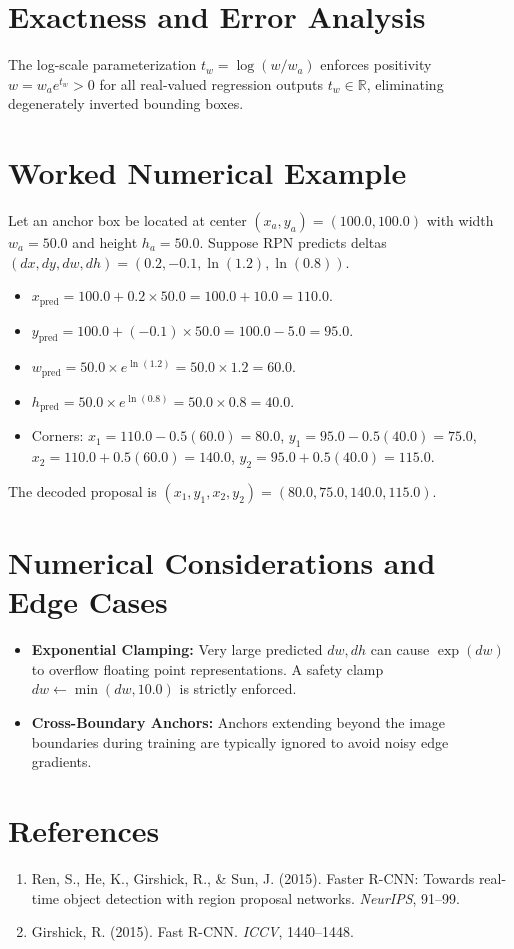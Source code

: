 \documentclass[11pt,a4paper]{article}
\theoremstyle{definition}
\begin{document}
\section{Exactness and Error Analysis}

The log-scale parameterization $t_w = \log(w / w_a)$ enforces positivity $w = w_a e^{t_w} > 0$ for all real-valued regression outputs $t_w \in \mathbb{R}$, eliminating degenerately inverted bounding boxes.

\section{Worked Numerical Example}

Let an anchor box be located at center $(x_a, y_a) = (100.0, 100.0)$ with width $w_a = 50.0$ and height $h_a = 50.0$.
Suppose RPN predicts deltas $(dx, dy, dw, dh) = (0.2, -0.1, \ln(1.2), \ln(0.8))$.
\begin{itemize}
    \item $x_{\text{pred}} = 100.0 + 0.2 \times 50.0 = 100.0 + 10.0 = 110.0$.
    \item $y_{\text{pred}} = 100.0 + (-0.1) \times 50.0 = 100.0 - 5.0 = 95.0$.
    \item $w_{\text{pred}} = 50.0 \times e^{\ln(1.2)} = 50.0 \times 1.2 = 60.0$.
    \item $h_{\text{pred}} = 50.0 \times e^{\ln(0.8)} = 50.0 \times 0.8 = 40.0$.
    \item Corners:
    $x_1 = 110.0 - 0.5(60.0) = 80.0$, $y_1 = 95.0 - 0.5(40.0) = 75.0$,
    $x_2 = 110.0 + 0.5(60.0) = 140.0$, $y_2 = 95.0 + 0.5(40.0) = 115.0$.
\end{itemize}
The decoded proposal is $(x_1, y_1, x_2, y_2) = (80.0, 75.0, 140.0, 115.0)$.

\section{Numerical Considerations and Edge Cases}

\begin{itemize}
    \item \textbf{Exponential Clamping:} Very large predicted $dw, dh$ can cause $\exp(dw)$ to overflow floating point representations. A safety clamp $dw \gets \min(dw, 10.0)$ is strictly enforced.
    \item \textbf{Cross-Boundary Anchors:} Anchors extending beyond the image boundaries during training are typically ignored to avoid noisy edge gradients.
\end{itemize}

\section{References}
\begin{enumerate}
    \item Ren, S., He, K., Girshick, R., & Sun, J. (2015). Faster R-CNN: Towards real-time object detection with region proposal networks. \emph{NeurIPS}, 91--99.
    \item Girshick, R. (2015). Fast R-CNN. \emph{ICCV}, 1440--1448.
\end{enumerate}
\end{document}
